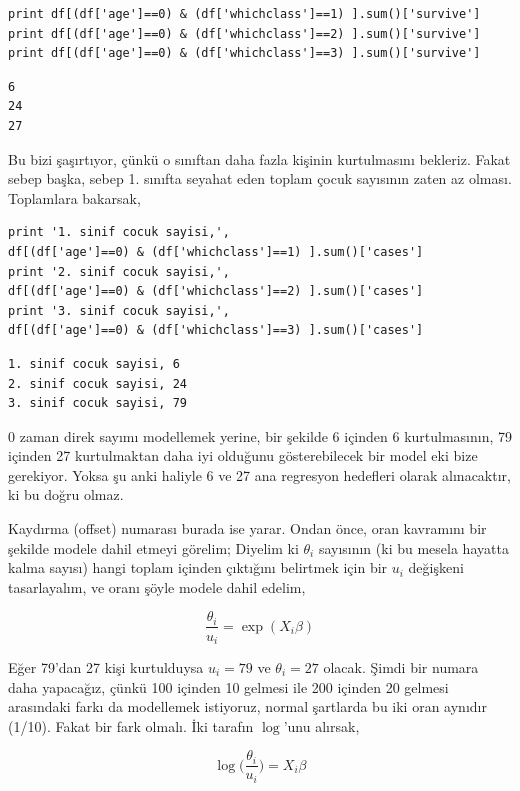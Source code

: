 \documentclass[12pt,fleqn]{article}\usepackage{../../common}
\begin{document}
\begin{verbatim}
print df[(df['age']==0) & (df['whichclass']==1) ].sum()['survive']
print df[(df['age']==0) & (df['whichclass']==2) ].sum()['survive']
print df[(df['age']==0) & (df['whichclass']==3) ].sum()['survive']
\end{verbatim}

\begin{verbatim}
6
24
27
\end{verbatim}

Bu bizi şaşırtıyor, çünkü o sınıftan daha fazla kişinin kurtulmasını
bekleriz. Fakat sebep başka, sebep 1. sınıfta seyahat eden toplam çocuk
sayısının zaten az olması. Toplamlara bakarsak,

\begin{verbatim}
print '1. sinif cocuk sayisi,', 
df[(df['age']==0) & (df['whichclass']==1) ].sum()['cases']
print '2. sinif cocuk sayisi,', 
df[(df['age']==0) & (df['whichclass']==2) ].sum()['cases']
print '3. sinif cocuk sayisi,', 
df[(df['age']==0) & (df['whichclass']==3) ].sum()['cases']
\end{verbatim}

\begin{verbatim}
1. sinif cocuk sayisi, 6
2. sinif cocuk sayisi, 24
3. sinif cocuk sayisi, 79
\end{verbatim}

0 zaman direk sayımı modellemek yerine, bir şekilde 6 içinden 6
kurtulmasının, 79 içinden 27 kurtulmaktan daha iyi olduğunu gösterebilecek
bir model eki bize gerekiyor. Yoksa şu anki haliyle 6 ve 27 ana regresyon
hedefleri olarak alınacaktır, ki bu doğru olmaz. 

Kaydırma (offset) numarası burada ise yarar. Ondan önce, oran kavramını bir
şekilde modele dahil etmeyi görelim; Diyelim ki $\theta_i$ sayısının (ki bu
mesela hayatta kalma sayısı) hangi toplam içinden çıktığını belirtmek için
bir $u_i$ değişkeni tasarlayalım, ve oranı şöyle modele dahil edelim,

$$ \frac{\theta_i}{u_i} = \exp (X_i\beta) $$

Eğer 79'dan 27 kişi kurtulduysa $u_i=79$ ve $\theta_i=27$ olacak. Şimdi bir
numara daha yapacağız, çünkü 100 içinden 10 gelmesi ile 200 içinden 20
gelmesi arasındaki farkı da modellemek istiyoruz, normal şartlarda bu iki
oran aynıdır (1/10). Fakat bir fark olmalı. İki tarafın $\log$'unu alırsak,

$$ \log \bigg(\frac{\theta_i}{u_i} \bigg) = X_i\beta $$
\end{document}
